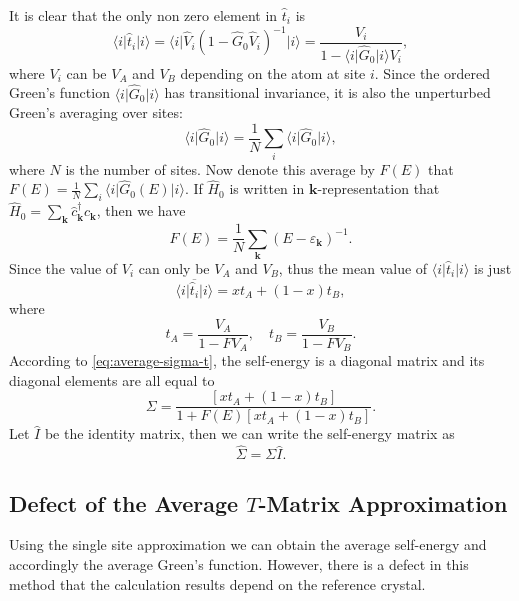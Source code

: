 \documentclass{book}
\newcommand{\bra}[1]{{\langle#1|}}
\newcommand{\ket}[1]{{|#1\rangle}}
\numberwithin{equation}{section}
\begin{document}
It is clear that the only non zero element in $\hat{t}_i$ is
\begin{equation}
    \bra{i}\hat{t}_i\ket{i}=\bra{i}\hat{V}_i
    (1-\hat{G}_0\hat{V}_i)^{-1}\ket{i}
    =\frac{V_i}{1-\bra{i}\hat{G}_0\ket{i}V_i},
\end{equation}
where $V_i$ can be $V_A$ and $V_B$ depending on the atom at site
$i$. Since the ordered Green's function $\bra{i}\hat{G}_0\ket{i}$ has
transitional invariance, it is also the unperturbed Green's averaging
over sites:
\begin{equation}
  \bra{i}\hat{G}_0\ket{i}=\frac{1}{N}\sum_i\bra{i}\hat{G}_0\ket{i},
\end{equation}
where $N$ is the number of sites.  Now denote this average by $F(E)$
that $F(E)=\frac{1}{N}\sum_i\bra{i}\hat{G}_0(E)\ket{i}$. If
$\hat{H}_0$ is written in $\bm{k}$-representation that
$\hat{H}_0=\sum_{\bm{k}}\hat{c}_{\bm{k}}^\dagger\hat{c}_{\bm{k}}$,
then we have
\begin{equation}
  F(E)=\frac{1}{N}\sum_{\bm{k}}(E-\varepsilon_{\bm{k}})^{-1}.
\end{equation}
Since the value of $V_i$ can only be $V_A$ and $V_B$, thus the mean
value of $\bra{i}\hat{t}_i\ket{i}$ is just
\begin{equation}
  \overline{\bra{i}\hat{t}_i\ket{i}}=xt_A+(1-x)t_B,
\end{equation}
where
\begin{equation}
  t_A=\frac{V_A}{1-FV_A},\quad t_B=\frac{V_B}{1-FV_B}.
\end{equation}
According to \eqref{eq:average-sigma-t}, the self-energy is a diagonal
matrix and its diagonal elements are all equal to 
\begin{equation}
  \label{eq:average-sigma}
  \Sigma=\frac{[xt_A+(1-x)t_B]}{1+F(E)[xt_A+(1-x)t_B]}.
\end{equation}
Let $\hat{I}$ be the identity matrix, then we can write the
self-energy matrix as
\begin{equation}
  \hat{\Sigma}=\Sigma\hat{I}.
\end{equation}

\subsection*{Defect of the Average $T$-Matrix Approximation}
Using the single site approximation we can obtain the average
self-energy and accordingly the average Green's function. However,
there is a defect in this method that the calculation results depend
on the reference crystal.
\end{document}
